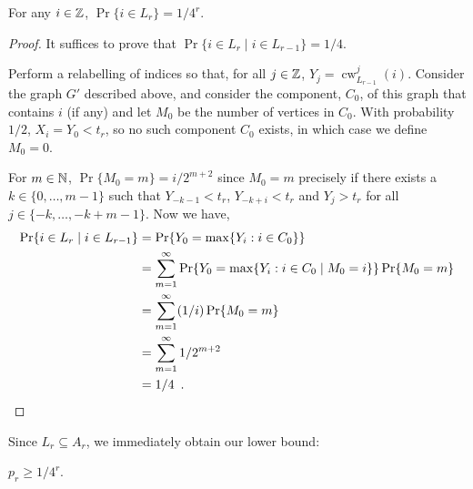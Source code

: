 \documentclass{patmorin}
\DeclareMathOperator{\cw}{cw}
\begin{document}
\begin{lem}
   For any $i\in\mathbb{Z}$, $\Pr\{i\in L_r\} = 1/4^r$.
\end{lem}

\begin{proof}
   It suffices to prove that $\Pr\{i\in L_r \mid i\in L_{r-1}\} = 1/4$.  

   Perform a relabelling of indices so that, for all $j\in\mathbb{Z}$,
   $Y_j=\cw^j_{L_{r-1}}(i)$.  Consider the graph $G'$ described above,
   and consider the component, $C_0$, of this graph that contains
   $i$ (if any) and let $M_0$ be the number of vertices in $C_0$.
   With probability $1/2$, $X_i=Y_0 < t_r$, so no such component $C_0$
   exists, in which case we define $M_0=0$.

   For $m \in \mathbb{N}$, $\Pr\{M_0=m\} = i/2^{m+2}$
   since $M_0=m$ precisely if there exists a $k\in\{0,\ldots,m-1\}$
   such that $Y_{-k-1}< t_r$, $Y_{-k+i}<t_r$ and $Y_j > t_r$ for all
   $j\in\{-k,\ldots,-k+m-1\}$.  Now we have,
   \begin{align*}
      \Pr\{i\in L_r\mid i\in L_{r-1}\} 
          & = \Pr\{Y_0=\max\{Y_i:i\in C_0\}\} \\
          & = \sum_{m=1}^\infty \Pr\{Y_0=\max\{Y_i:i\in C_0\mid M_0=i\}\}\Pr\{M_0=m\} \\ 
          & = \sum_{m=1}^\infty (1/i)\Pr\{M_0=m\} \\
          & = \sum_{m=1}^\infty 1/2^{m+2} \\
          & = 1/4 \enspace . \qedhere
   \end{align*}
\end{proof}

Since $L_r\subseteq A_r$, we immediately obtain our lower bound:
\begin{cor}
   $p_r \ge 1/4^r$.
\end{cor}




\end{document}
